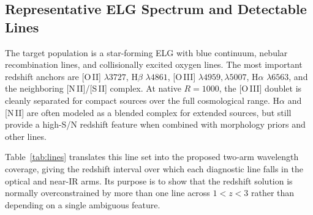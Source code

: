\documentclass[10pt,onecolumn]{article}
\begin{document}
\subsection{Representative ELG Spectrum and Detectable Lines}

The target population is a star-forming ELG with blue continuum, nebular recombination lines, and collisionally excited oxygen lines. The most important redshift anchors are [O\,II] $\lambda3727$, H$\beta$ $\lambda4861$, [O\,III] $\lambda4959,\lambda5007$, H$\alpha$ $\lambda6563$, and the neighboring [N\,II]/[S\,II] complex. At native $R=1000$, the [O\,III] doublet is cleanly separated for compact sources over the full cosmological range. H$\alpha$ and [N\,II] are often modeled as a blended complex for extended sources, but still provide a high-S/N redshift feature when combined with morphology priors and other lines.

Table~\ref{tab:lines} translates this line set into the proposed two-arm wavelength coverage, giving the redshift interval over which each diagnostic line falls in the optical and near-IR arms. Its purpose is to show that the redshift solution is normally overconstrained by more than one line across $1<z<3$ rather than depending on a single ambiguous feature.
\end{document}
